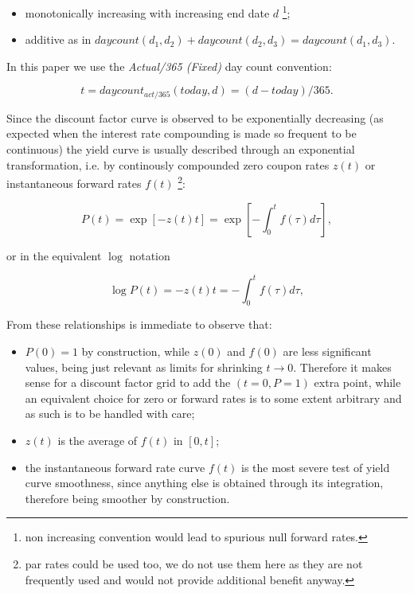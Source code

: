 \documentclass[11pt,reqno]{amsart}
\begin{document}
\begin{itemize}
\item monotonically increasing with increasing end date $d$ \footnote{%
non increasing convention would lead to spurious null forward rates.};

\item additive as in $daycount\left( d_{1},d_{2}\right) +daycount\left(
d_{2},d_{3}\right) =daycount\left( d_{1},d_{3}\right) $.
\end{itemize}

In this paper we use the \textit{Actual/365 (Fixed)} \cite{ISDA} day count
convention:

\begin{equation*}
t=daycount_{act/365}\left( today,d\right) =\left( d-today\right) /365.
\end{equation*}

Since the discount factor curve is observed to be exponentially decreasing
(as expected when the interest rate compounding is made so frequent to be
continuous) the yield curve is usually described through an exponential
transformation, i.e. by continously compounded zero coupon rates $z(t)$ or
instantaneous forward rates $f(t)$ \footnote{%
par rates could be used too, we do not use them here as they are not
frequently used and would not provide additional benefit anyway.}:

\begin{equation}
P(t)=\exp \left[ -z\left( t\right) t\right] =\exp \left[ -\int_{0}^{t}f%
\left( \tau \right) d\tau \right] ,  \label{eqn:relationship}
\end{equation}

or in the equivalent $\log$ notation

\begin{equation}
\log P\left( t\right) =-z\left( t\right) t=-\int_{0}^{t}f(\tau )d\tau ,
\label{eqn:logrelationship}
\end{equation}

From these relationships is immediate to observe that:

\begin{itemize}
\item $P\left( 0\right) =1$ by construction, while $z\left( 0\right) $ and $%
f\left( 0\right) $ are less significant values, being just relevant as
limits for shrinking $t\rightarrow 0$. Therefore it makes sense for a
discount factor grid to add the $\left( t=0,P=1\right) $ extra point, while
an equivalent choice for zero or forward rates is to some extent arbitrary
and as such is to be handled with care;

\item $z\left( t\right) $ is the average of $f\left( t\right) $ in $\left[
0,t\right] $;

\item the instantaneous forward rate curve $f\left( t\right) $ is the most
severe test of yield curve smoothness, since anything else is obtained
through its integration, therefore being smoother by construction.
\end{itemize}
\end{document}
